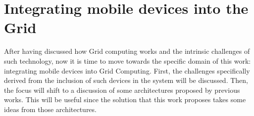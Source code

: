 \chapter{Integrating mobile devices into the Grid}
After having discussed how Grid computing works and the intrinsic challenges of such technology, now it is time to move towards the specific domain of this work: integrating mobile devices into Grid Computing. First, the challenges specifically derived from the inclusion of such devices in the system will be discussed. Then, the focus will shift to a discussion of some architectures proposed by previous works. This will be useful since the solution that this work proposes takes some ideas from those architectures.


